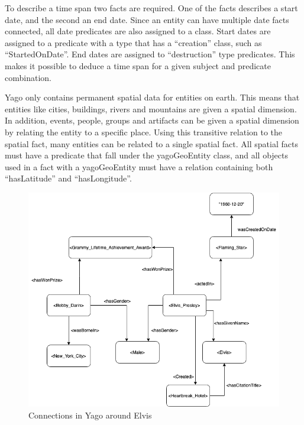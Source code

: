 To describe a time span two facts are required. One of the facts describes a start date, and the second an end date. Since an entity can have multiple date facts connected, all date predicates are also assigned to a class. Start dates are assigned to a predicate with a type that has a ``creation'' class, such as ``StartedOnDate''. End dates are assigned to ``destruction'' type predicates. This makes it possible to deduce a time span for a given subject and predicate combination\cite{yago}.

Yago only contains permanent spatial data for entities on earth. This means that entities like cities, buildings, rivers and mountains are given a spatial dimension. In addition, events, people, groups and artifacts can be given a spatial dimension by relating the entity to a specific place. Using this transitive relation to the spatial fact, many entities can be related to a single spatial fact. All spatial facts must have a predicate that fall under the yagoGeoEntity class, and all objects used in a fact with a yagoGeoEntity must have a relation containing both ``hasLatitude'' and ``hasLongitude''.

\begin{figure}[t]
  \centering
  \includegraphics[scale=0.5]{figs/yagoExample.png}
 \caption{Connections in Yago around Elvis}
 \label{fig:Elvis}
\end{figure}

